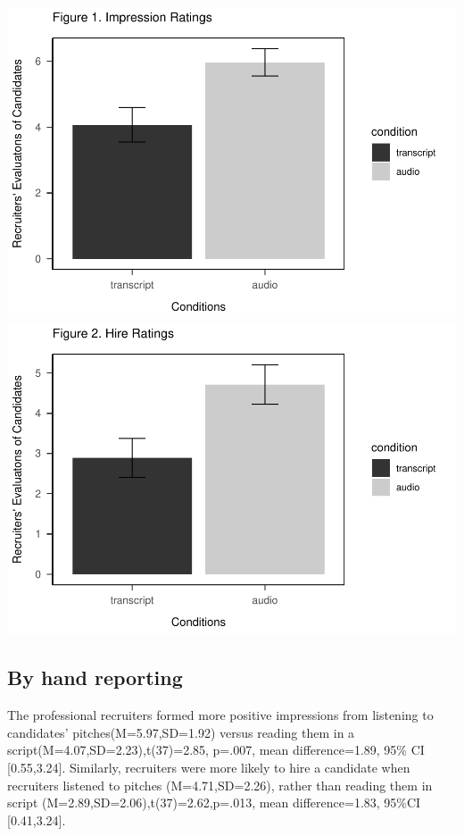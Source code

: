 \documentclass[
  english,
  man]{apa6}
\begin{document}
\includegraphics{APAreport_files/figure-latex/unnamed-chunk-3-1.pdf} \includegraphics{APAreport_files/figure-latex/unnamed-chunk-3-2.pdf}

\hypertarget{by-hand-reporting}{%
\subsection{By hand reporting}\label{by-hand-reporting}}

The professional recruiters formed more positive impressions from listening to candidates' pitches(M=5.97,SD=1.92) versus reading them in a script(M=4.07,SD=2.23),t(37)=2.85, p=.007, mean difference=1.89, 95\% CI {[}0.55,3.24{]}. Similarly, recruiters were more likely to hire a candidate when recruiters listened to pitches (M=4.71,SD=2.26), rather than reading them in script (M=2.89,SD=2.06),t(37)=2.62,p=.013, mean difference=1.83, 95\%CI {[}0.41,3.24{]}.
\end{document}
